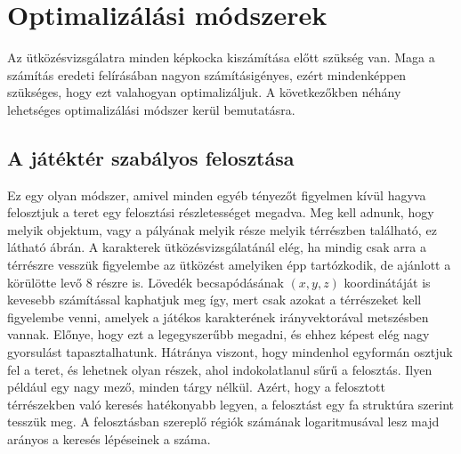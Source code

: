 \section{Optimalizálási módszerek}

Az ütközésvizsgálatra minden képkocka kiszámítása előtt szükség van. Maga a számítás eredeti felírásában nagyon számításigényes, ezért mindenképpen szükséges, hogy ezt valahogyan optimalizáljuk. A következőkben néhány lehetséges optimalizálási módszer kerül bemutatásra.

\subsection{A játéktér szabályos felosztása}

Ez egy olyan módszer, amivel minden egyéb tényezőt figyelmen kívül hagyva felosztjuk a teret egy felosztási részletességet megadva. Meg kell adnunk, hogy melyik objektum, vagy a pályának melyik része melyik térrészben található, ez látható  ábrán. A karakterek ütközésvizsgálatánál elég, ha mindig csak arra a térrészre vesszük figyelembe az ütközést amelyiken épp tartózkodik, de ajánlott a körülötte levő 8 részre is. Lövedék becsapódásának $(x, y, z)$ koordinátáját is kevesebb számítással kaphatjuk meg így, mert csak azokat a térrészeket kell figyelembe venni, amelyek a játékos karakterének irányvektorával metszésben vannak. Előnye, hogy ezt a legegyszerűbb megadni, és ehhez képest elég nagy gyorsulást tapasztalhatunk. Hátránya viszont, hogy mindenhol egyformán osztjuk fel a teret, és lehetnek olyan részek, ahol indokolatlanul sűrű a felosztás. Ilyen például egy nagy mező, minden tárgy nélkül. Azért, hogy a felosztott térrészekben való keresés hatékonyabb legyen, a felosztást egy fa struktúra szerint tesszük meg. A felosztásban szereplő régiók számának logaritmusával lesz majd arányos a keresés lépéseinek a száma.

